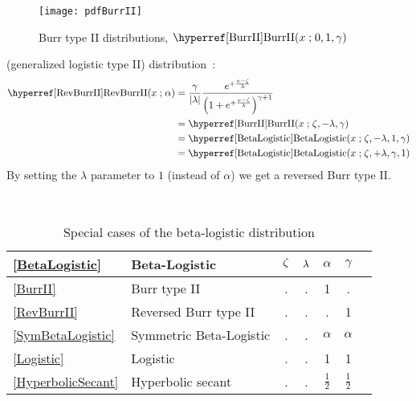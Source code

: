 \begin{figure}[t!]
\begin{center}
\texttt{[image: pdfBurrII]}
\end{center}
\caption[Burr II distributions]{Burr type II distributions, $\opr{BurrII}(x\given0,1,\gamma)$}
\end{figure}


 (generalized logistic type II) distribution~\cite{Johnson1994}:
\begin{align}
\label{RevBurrII}
\opr{RevBurrII}(x\given \alpha) 
& = \frac{\gamma}{|\pScale|}   \frac{e^{+ \frac{x-\pLoc}{\pScale} } } { \left(1 + e^{+\frac{x-\pLoc}{\pScale}  }\right)^{\gamma+1} }
\checked
\\
& = \opr{BurrII}(x\given \pLoc, -\pScale,  \gamma) \notag \checked \\
& = \opr{BetaLogistic}(x\given \pLoc, -\pScale, 1, \gamma) \notag \checked \\
& = \opr{BetaLogistic}(x\given \pLoc, +\pScale, \gamma, 1)  \notag \checked
\notag
\end{align}
By setting the $\lambda$ parameter to $1$ (instead of $\alpha$) we get a reversed Burr type II.


\begin{table*}[ptb]
\begin{center}
\caption[Beta-logistic distribution -- Special cases]{Special cases of the beta-logistic distribution}
~\\
{\renewcommand{\arraystretch}{1.25} 
\begin{tabular}{llccccl}
\eqref{BetaLogistic} & Beta-Logistic & $\zeta$ & $\lambda$ & $\alpha$ &  $\gamma$ \\
\hline  
\eqref{BurrII} & Burr type II					&. & . & 1 & . & \\
\eqref{RevBurrII}& Reversed Burr type II		&	. & . & . & 1 &\\
\eqref{SymBetaLogistic}& Symmetric Beta-Logistic		&	. &   . & $\alpha$ & $\alpha$ & \\
\eqref{Logistic}& Logistic					& 	. & . & 1 & 1 & \\
\eqref{HyperbolicSecant}& Hyperbolic secant	&	. & . & $\tfrac{1}{2}$ & $\tfrac{1}{2}$ & \\
\end{tabular}
}
\end{center}
\end{table*}





